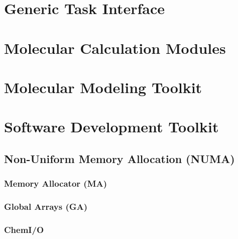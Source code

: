 \chapter{Generic Task Interface}


\chapter{Molecular Calculation Modules}


\chapter{Molecular Modeling Toolkit}




 

\chapter{Software Development Toolkit}

\section{Non-Uniform Memory Allocation (NUMA)}

\subsection{Memory Allocator (MA)}

\subsection{Global Arrays (GA)}

\subsection{ChemI/O}


